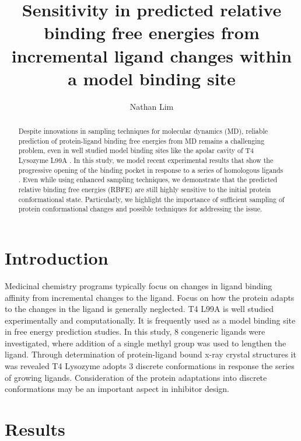 \documentclass[journal=jctcce,manuscript=article]{achemso}
\author{Nathan Lim}
\affiliation[University of California, Irvine]
{Department of Pharmaceutical Sciences}
\title{Sensitivity in predicted relative binding free energies from incremental ligand changes within a model binding site}
\begin{document}
\begin{abstract}
Despite innovations in sampling techniques for molecular dynamics (MD), reliable prediction of protein-ligand binding free energies from MD remains a challenging problem, even in well studied model binding sites like the apolar cavity of T4 Lysozyme L99A \cite{Boyce2009}.
In this study, we model recent experimental results that show the progressive opening of the binding pocket in response to a series of homologous ligands \cite{Merski2015}.
Even while using enhanced sampling techniques, we demonstrate that the predicted relative binding free energies (RBFE) are still highly sensitive to the initial protein conformational state.
Particularly, we highlight the importance of sufficient sampling of protein conformational changes and possible techniques for addressing the issue.
\end{abstract}

\pagebreak


\section{Introduction}
Medicinal chemistry programs typically focus on changes in ligand binding affinity from incremental changes to the ligand.
Focus on how the protein adapts to the changes in the ligand is generally neglected.
T4 L99A is well studied experimentally and computationally.
It is frequently used as a model binding site in free energy prediction studies.
In this study, 8 congeneric ligands were investigated, where addition of a single methyl group was used to lengthen the ligand.
Through determination of protein-ligand bound x-ray crystal structures it was revealed T4 Lysozyme adopts 3 discrete conformations in response the series of growing ligands.
Consideration of the protein adaptations into discrete conformations may be an important aspect in inhibitor design.

\section{Results}
\end{document}
